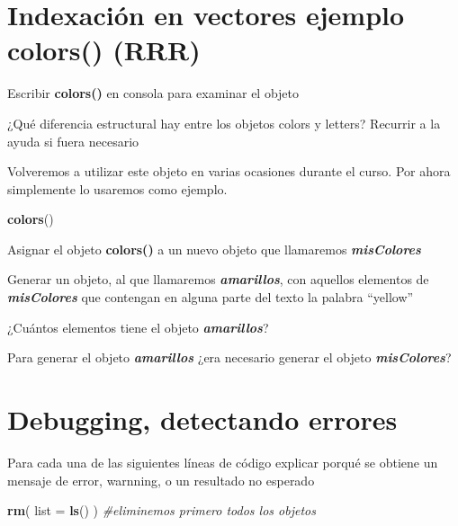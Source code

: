 \documentclass[]{book}
\newenvironment{Shaded}{\begin{snugshade}}{\end{snugshade}}
\newcommand{\CommentTok}[1]{\textcolor[rgb]{0.56,0.35,0.01}{\textit{#1}}}
\newcommand{\DataTypeTok}[1]{\textcolor[rgb]{0.13,0.29,0.53}{#1}}
\newcommand{\KeywordTok}[1]{\textcolor[rgb]{0.13,0.29,0.53}{\textbf{#1}}}
\newcommand{\NormalTok}[1]{#1}
\begin{document}
\hypertarget{indexaciuxf3n-en-vectores-ejemplo-colors-rrr}{%
\section{Indexación en vectores ejemplo colors() (RRR)}\label{indexaciuxf3n-en-vectores-ejemplo-colors-rrr}}

Escribir \textbf{colors()} en consola para examinar el objeto

¿Qué diferencia estructural hay entre los objetos colors y letters? Recurrir a la ayuda si fuera necesario

Volveremos a utilizar este objeto en varias ocasiones durante el curso. Por ahora simplemente lo usaremos como ejemplo.

\begin{Shaded}
\begin{Highlighting}[]
\KeywordTok{colors}\NormalTok{()}
\end{Highlighting}
\end{Shaded}

Asignar el objeto \textbf{colors()} a un nuevo objeto que llamaremos \textbf{\emph{misColores}}

Generar un objeto, al que llamaremos \textbf{\emph{amarillos}}, con aquellos elementos de \textbf{\emph{misColores}} que contengan en alguna parte del texto la palabra ``yellow''

¿Cuántos elementos tiene el objeto \textbf{\emph{amarillos}}?

Para generar el objeto \textbf{\emph{amarillos}} ¿era necesario generar el objeto \textbf{\emph{misColores}}?

\hypertarget{debugging-detectando-errores-1}{%
\section*{Debugging, detectando errores}\label{debugging-detectando-errores-1}}

Para cada una de las siguientes líneas de código explicar porqué se obtiene un mensaje de error, warnning, o un resultado no esperado

\begin{Shaded}
\begin{Highlighting}[]
\KeywordTok{rm}\NormalTok{( }\DataTypeTok{list =} \KeywordTok{ls}\NormalTok{() ) }\CommentTok{#eliminemos primero todos los objetos}
\end{Highlighting}
\end{Shaded}
\end{document}

